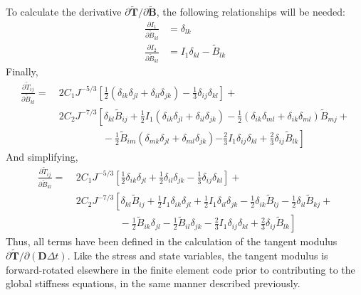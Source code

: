 To calculate the derivative $\partial \tilde{\bm T}/\partial {\tilde{\bm {B}}}$, the following relationships will be needed:
\begin{align}
\frac{\partial I_1}{\partial \tilde{B}_{kl}} &= \delta_{lk}  \\
\frac{\partial I_2}{\partial \tilde{B}_{kl}} &= I_1\delta_{kl} - \tilde{B}_{lk}
\end{align}
Finally,
\begin{equation}
\begin{aligned}
\frac{\partial \tilde{T}_{ij}}{\partial \tilde{B}_{kl}} = &\ 2C_1J^{-5/3}\left[\frac{1}{2}\left(\delta_{ik}\delta_{jl} + \delta_{il}\delta_{jk}\right) - \frac{1}{3}\delta_{ij}\delta_{kl}\right] + \\
&\ 2C_2J^{-7/3}\left[\delta_{kl}\tilde{B}_{ij} + \frac{1}{2}I_1\left(\delta_{ik}\delta_{jl} + \delta_{il}\delta_{jk}\right) -\frac{1}{2}\left(\delta_{ik}\delta_{ml} + \delta_{ik}\delta_{ml}\right)\tilde{B}_{mj} \right. + \\
&\phantom{xxxxxxxx}-\frac{1}{2}\tilde{B}_{im}\left(\delta_{mk}\delta_{jl} +\delta_{ml}\delta_{jk}\right) 
\left.- \frac{2}{3}I_1\delta_{ij}\delta_{kl} + \frac{2}{3}\delta_{ij}\tilde{B}_{lk}\right]
\end{aligned}
\end{equation}
And simplifying,
\begin{equation}
\begin{aligned}
\frac{\partial \tilde{T}_{ij}}{\partial \tilde{B}_{kl}} = &\ 2C_1J^{-5/3}\left[\frac{1}{2}\delta_{ik}\delta_{jl} + \frac{1}{2}\delta_{il}\delta_{jk} - \frac{1}{3}\delta_{ij}\delta_{kl}\right] + \\
&\ 2C_2J^{-7/3}\left[\delta_{kl}\tilde{B}_{ij} + \frac{1}{2}I_1\delta_{ik}\delta_{jl} + \frac{1}{2}I_1\delta_{il}\delta_{jk} -\frac{1}{2}\delta_{ik}\tilde{B}_{lj} -\frac{1}{2}\delta_{il}\tilde{B}_{kj} \right. + \\
&\left.\phantom{xxxxxxxx}-\frac{1}{2}\tilde{B}_{ik}\delta_{jl} -\frac{1}{2}\tilde{B}_{il}\delta_{jk} - \frac{2}{3}I_1\delta_{ij}\delta_{kl} + \frac{2}{3}\delta_{ij}\tilde{B}_{lk}\right]
\end{aligned}
\end{equation}
Thus, all terms have been defined in the calculation of the tangent modulus $\partial{\tilde{\bm{T}}}/\partial({\bm{D}\Delta{t}})$. Like the stress and state variables, the tangent modulus is forward-rotated elsewhere in the finite element code prior to contributing to the global stiffness equations, in the same manner described previously.

